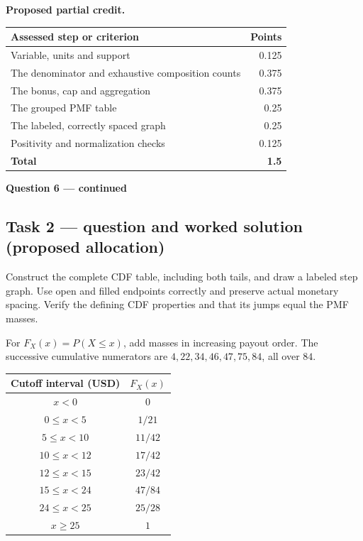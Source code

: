 \par\smallskip
\noindent\begin{minipage}{\linewidth}
\textbf{Proposed partial credit.}\par\smallskip
\begin{tabularx}{\linewidth}{@{}>{\raggedright\arraybackslash}X r@{}}\toprule
\textbf{Assessed step or criterion} & \textbf{Points}\\\midrule
Variable, units and support & 0.125\\
The denominator and exhaustive composition counts & 0.375\\
The bonus, cap and aggregation & 0.375\\
The grouped PMF table & 0.25\\
The labeled, correctly spaced graph & 0.25\\
Positivity and normalization checks & 0.125\\
\midrule
\textbf{Total} & \textbf{1.5}\\
\bottomrule\end{tabularx}
\end{minipage}\par\smallskip

\par\vspace{3mm}\secInicio[][sec:q6]

\clearpage
\textbf{Question 6 --- continued}

\subsection*{Task 2 --- question and worked solution (proposed allocation) }
\label{sol:q6t2}

Construct the complete CDF table, including both tails, and draw a labeled step graph. Use open and filled endpoints correctly and preserve actual monetary spacing. Verify the defining CDF properties and that its jumps equal the PMF masses.

For $F_X(x)=P(X\leq x)$, add masses in increasing payout order. The successive cumulative numerators are $4,22,34,46,47,75,84$, all over $84$.

\begin{center}
\begin{tabular}{cc}\toprule
Cutoff interval (USD) & $F_X(x)$\\\midrule
$x<0$ & $0$\\
$0\leq x<5$ & $1/21$\\
$5\leq x<10$ & $11/42$\\
$10\leq x<12$ & $17/42$\\
$12\leq x<15$ & $23/42$\\
$15\leq x<24$ & $47/84$\\
$24\leq x<25$ & $25/28$\\
$x\geq 25$ & $1$\\
\bottomrule\end{tabular}
\end{center}

